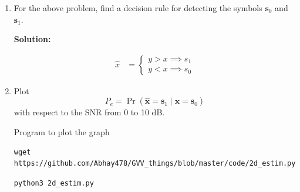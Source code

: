 \documentclass[journal,12pt,twocolumn]{IEEEtran}
\DeclareMathOperator*{\pipe}{|}
\renewcommand\thesection{\arabic{section}}
\providecommand{\mbf}{\mathbf}
\providecommand{\pr}[1]{\ensuremath{\Pr\left(#1\right)}}
\theoremstyle{remark}
\newcommand{\solution}{\noindent \textbf{Solution: }}
\numberwithin{equation}{section}
\numberwithin{equation}{section}
\begin{document}
\begin{enumerate}[label=\thesection.\arabic*,ref=\thesection.\theenumi]
\newpage
\item
For the above problem, find a decision rule for detecting the symbols $\mbf{s}_0 $ and $\mbf{s}_1$.

\solution

\begin{align}
    \hat{x} &= 
    \begin{cases}
        y > x \implies s_1 \\
        y < x \implies s_0
    \end{cases}
\end{align}

%
\item
Plot 
\begin{equation} 
P_e = \pr{\hat{\mbf{x}} = \mbf{s}_1\pipe\mbf{x} = \mbf{s}_0}
\end{equation}
with respect to the SNR from 0 to 10 dB.

Program to plot the graph
\begin{lstlisting}
wget https://github.com/Abhay478/GVV_things/blob/master/code/2d_estim.py
\end{lstlisting}

\begin{lstlisting}
python3 2d_estim.py
\end{lstlisting}


\end{enumerate}
\end{document}
